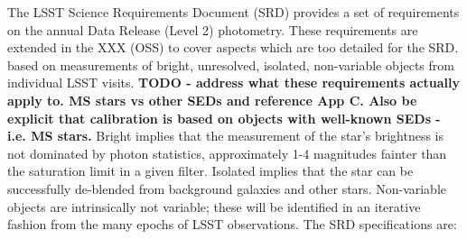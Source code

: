 \documentclass[12pt,preprint]{aastex}
\begin{document}
The LSST Science Requirements Document (SRD) provides a set of
requirements on the annual Data Release (Level 2) photometry.  These
requirements are extended in the XXX (OSS) to cover aspects which are
too detailed for the SRD.   based on
measurements of bright, unresolved, isolated, non-variable objects
from individual LSST visits. 
{\bf TODO - address what these requirements actually apply to. MS stars vs other SEDs and reference App C. Also be explicit that calibration is based on objects with well-known SEDs - i.e. MS stars. }
Bright implies that the
measurement of the star's brightness is not dominated by photon
statistics, approximately 1-4 magnitudes fainter than the saturation
limit in a given filter. Isolated implies that the star can be
successfully de-blended from background galaxies and other
stars. Non-variable objects are intrinsically not variable; these will
be identified in an iterative fashion from the many epochs of LSST
observations. The SRD specifications are: 
\end{document}
